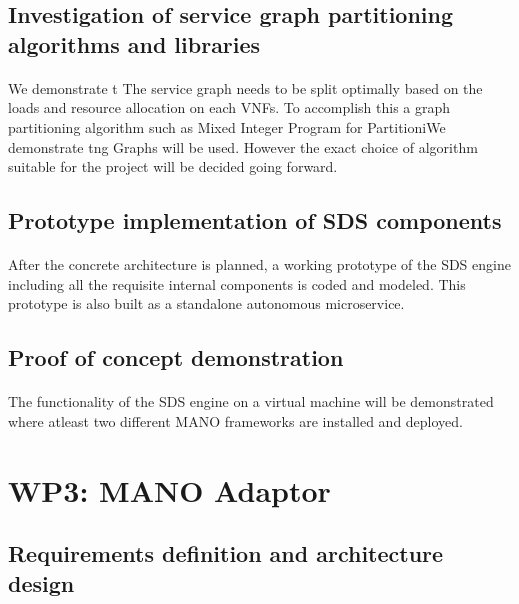 \subsection{Investigation of service graph partitioning algorithms and libraries}
\paragraph{}We demonstrate t
The service graph needs to be split optimally based on the loads and resource allocation on each VNFs. To accomplish this a graph partitioning algorithm such as Mixed Integer Program for PartitioniWe demonstrate tng Graphs will be used. However the exact choice of algorithm suitable for the project will be decided going forward.
\subsection{Prototype implementation of SDS components}
\paragraph{}
After the concrete architecture is planned, a working prototype of the SDS engine including all the requisite internal components is coded and modeled. This prototype is also built as a standalone autonomous microservice.
\subsection{Proof of concept demonstration}
\paragraph{}
The functionality of the SDS engine on a virtual machine will be demonstrated where atleast two different MANO frameworks are installed and deployed.

\section{WP3: MANO Adaptor}

\subsection{Requirements definition and architecture design}
\paragraph{}

